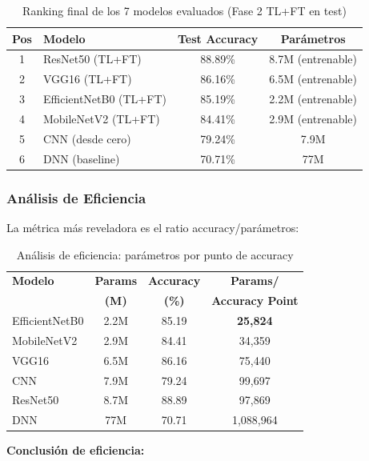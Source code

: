 \documentclass[11pt, a4paper]{article}
\begin{document}
\begin{table}[H]
\centering
\caption{Ranking final de los 7 modelos evaluados (Fase 2 TL+FT en test)}
\label{tab:final_ranking}
\begin{tabular}{@{}clcc@{}}
\toprule
\textbf{Pos} & \textbf{Modelo} & \textbf{Test Accuracy} & \textbf{Parámetros} \\
\midrule
1 & ResNet50 (TL+FT)       & 88.89\% & 8.7M (entrenable) \\
2 & VGG16 (TL+FT)          & 86.16\% & 6.5M (entrenable) \\
3 & EfficientNetB0 (TL+FT) & 85.19\% & 2.2M (entrenable) \\
4 & MobileNetV2 (TL+FT)    & 84.41\% & 2.9M (entrenable) \\
5 & CNN (desde cero)       & 79.24\% & 7.9M \\
6 & DNN (baseline)         & 70.71\% & 77M \\
\bottomrule
\end{tabular}
\end{table}

\subsubsection{Análisis de Eficiencia}

La métrica más reveladora es el ratio accuracy/parámetros:

\begin{table}[H]
\centering
\caption{Análisis de eficiencia: parámetros por punto de accuracy}
\label{tab:efficiency_analysis}
\begin{tabular}{@{}lccc@{}}
\toprule
\textbf{Modelo} & \textbf{Params} & \textbf{Accuracy} & \textbf{Params/} \\
 & \textbf{(M)} & \textbf{(\%)} & \textbf{Accuracy Point} \\
\midrule
EfficientNetB0 & 2.2M  & 85.19 & \textbf{25,824} \\
MobileNetV2    & 2.9M  & 84.41 & 34,359 \\
VGG16          & 6.5M  & 86.16 & 75,440 \\
CNN            & 7.9M  & 79.24 & 99,697 \\
ResNet50       & 8.7M  & 88.89 & 97,869 \\
DNN            & 77M   & 70.71 & 1,088,964 \\
\bottomrule
\end{tabular}
\end{table}

\textbf{Conclusión de eficiencia:}
\end{document}
